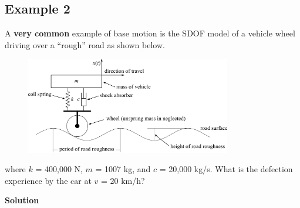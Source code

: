 \documentclass[12pt,a4paper]{article}
\begin{document}
		\subsection*{Example 2}
	
			A \textbf{very common} example of base motion is the SDOF model of a vehicle wheel driving over a ``rough'' road as shown below. 
			\begin{figure}[H]
				\centering
				\includegraphics[width=0.8\textwidth]{../../Figures/vehicle_on_road_example.png}
			\end{figure}				
			where $k$ = 400,000 N, $m$ = 1007 kg, and $c$ = 20,000 kg/s. What is the defection experience by the car at $v$ = 20 km/h?
			
			\textbf{Solution}
\end{document}
